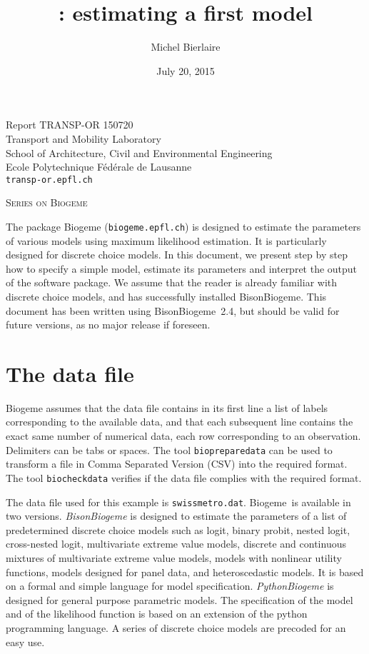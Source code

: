 \documentclass[12pt,a4paper]{article}
\title{\BBIOGEME: estimating a first model}
\author{Michel Bierlaire}
\date{July 20, 2015}
\newcommand{\BIOGEME}{Biogeme}
\newcommand{\BBIOGEME}{BisonBiogeme}
\begin{document}
\begin{titlepage}
\pagestyle{empty}

\maketitle
\vspace{2cm}

\begin{center}
\small Report TRANSP-OR 150720 \\ Transport and Mobility Laboratory \\ School of Architecture, Civil and Environmental Engineering \\ Ecole Polytechnique F\'ed\'erale de Lausanne \\ \verb+transp-or.epfl.ch+
\begin{center}
\textsc{Series on Biogeme}
\end{center}
\end{center}


\clearpage
\end{titlepage}

The package Biogeme (\texttt{biogeme.epfl.ch}) is designed to estimate the parameters of
various models using maximum likelihood estimation. It is particularly
designed for discrete choice models. In this document, we present step
by step how to specify a simple model, estimate its parameters and
interpret the output of the software package.  We assume that the
reader is already familiar with discrete choice models, and has
successfully installed \BBIOGEME. This document has been written using
\BBIOGEME\ 2.4, but should be valid for future versions, as no major
release if foreseen. 

\section{The data file}

Biogeme assumes that the data file contains in its first line a list
of labels corresponding to the available data, and that each
subsequent line contains the exact same number of numerical data, each
row corresponding to an observation. Delimiters can be tabs or
spaces. The tool \lstinline$biopreparedata$ can be used to transform a
file in Comma Separated Version (CSV) into the required format. The
tool \lstinline$biocheckdata$ verifies if the data file complies with
the required format.

The data file used for this example is \texttt{swissmetro.dat}.
\BIOGEME\ is available in two versions. \emph{BisonBiogeme} is designed to
estimate the parameters of a list of predetermined discrete choice
models such as logit, binary probit, nested logit, cross-nested logit,
multivariate extreme value models, discrete and continuous mixtures of
multivariate extreme value models, models with nonlinear utility
functions, models designed for panel data, and heteroscedastic
models. It is based on a formal and simple language for model
specification.
\emph{PythonBiogeme} is designed for general purpose parametric models. The
specification of the model and of the likelihood function is based on
an extension of the python programming language. A series of discrete
choice models are precoded for an easy use. 
\end{document}
